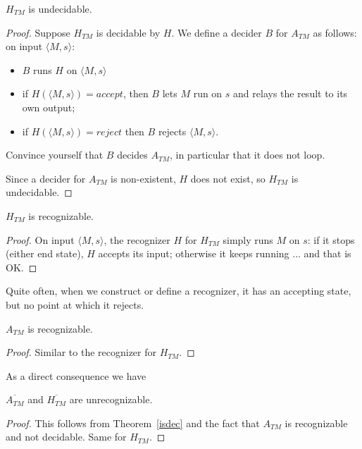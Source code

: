 \begin{theorem}
$H_{TM}$ is undecidable.
\end{theorem}
\begin{proof}
Suppose $H_{TM}$ is decidable by $H$. We define a decider $B$ for
$A_{TM}$ as follows: on input $\langle M,s \rangle$:
\begin{itemize}
\item $B$ runs $H$ on $\langle M,s \rangle$
\item if $H(\langle M,s \rangle) = \mathit{accept}$, then $B$ lets $M$ run on $s$ and relays the result to its own output;
\item if $H(\langle M,s \rangle) = \mathit{reject}$ then $B$ rejects $\langle M,s \rangle$.
\end{itemize}
Convince yourself that $B$ decides $A_{TM}$, in particular that it
does not loop.

Since a decider for $A_{TM}$ is non-existent, $H$ does not exist, so
$H_{TM}$ is undecidable.
\end{proof}

\begin{theorem}
$H_{TM}$ is recognizable.
\end{theorem}
\begin{proof}
On input $\langle M,s \rangle$, the recognizer $H$ for $H_{TM}$ simply
runs $M$ on $s$: if it stops (either end state), $H$ accepts its input;
otherwise it keeps running ... and that is OK.
\end{proof}

Quite often, when we construct or define a recognizer, it has an
accepting state, but no point at which it rejects.

\begin{theorem}
$A_{TM}$ is recognizable.
\end{theorem}
\begin{proof}
Similar to the recognizer for $H_{TM}$.
\end{proof}


As a direct consequence we have

\begin{corollary}
$\overline{A_{TM}}$ and $\overline{H_{TM}}$ are unrecognizable.
\end{corollary}
\begin{proof}
This follows from Theorem~\ref{isdec} and the fact that $A_{TM}$ is
recognizable and not decidable. Same for $H_{TM}$.
\end{proof}






